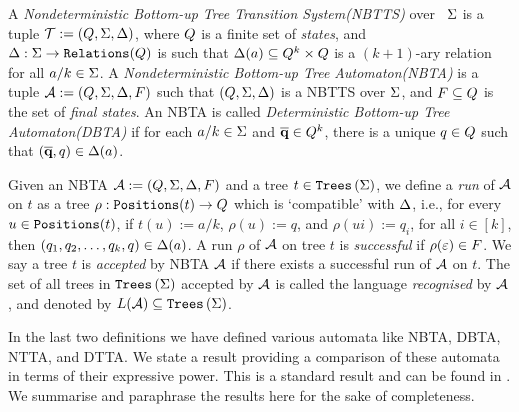 \begin{definition}\label{def:nbta}
    A \emph{Nondeterministic Bottom-up Tree Transition System(NBTTS)} over \rab\ $\Sigma$ is a tuple $\mathcal{T} := (Q, \Sigma, \Delta)$, where $Q$ is a finite set of \emph{states}, and $\Delta : \Sigma \to \texttt{Relations}(Q)$ is such that $\Delta(a) \subseteq Q^k \times Q$ is a $(k+1)$-ary relation for all $a/k \in \Sigma$. A \emph{Nondeterministic Bottom-up Tree Automaton(NBTA)} is a tuple $\mathcal{A} := (Q, \Sigma, \Delta, F)$ such that $(Q, \Sigma, \Delta)$ is a NBTTS over $\Sigma$, and $F \subseteq Q$ is the set of \emph{final states}. An NBTA is called \emph{Deterministic Bottom-up Tree Automaton(DBTA)} if for each $a/k \in \Sigma$ and $\overline{\textbf{q}} \in Q^k$, there is a unique $q \in Q$ such that $(\overline{\textbf{q}}, q) \in \Delta(a)$.
\end{definition}

\begin{definition}\label{def:runAcceptanceNbta}
    Given an NBTA $\mathcal{A} := (Q, \Sigma, \Delta, F)$ and a tree $t \in \texttt{Trees}\left(\Sigma\right)$, we define a \emph{run} of $\mathcal{A}$ on $t$ as a tree $\rho : \texttt{Positions}(t) \to Q$ which is `compatible' with $\Delta$, i.e., for every $u \in \texttt{Positions}(t)$, if $t(u) := a/k$, $\rho(u) := q$, and $\rho(ui) := q_i$, for all $i \in [k]$, then $(q_1, q_2, \dots, q_k, q) \in \Delta(a)$. A run $\rho$ of $\mathcal{A}$ on tree $t$ is \emph{successful} if $\rho(\varepsilon) \in F$. We say a tree $t$ is \emph{accepted} by NBTA $\mathcal{A}$ if there exists a successful run of $\mathcal{A}$ on $t$. The set of all trees in $\texttt{Trees}\left(\Sigma\right)$ accepted by $\mathcal{A}$ is called the language \emph{recognised} by $\mathcal{A}$, and denoted by $L(\mathcal{A}) \subseteq \texttt{Trees}\left(\Sigma\right)$.
\end{definition}

In the last two definitions we have defined various automata like NBTA, DBTA, NTTA, and DTTA. We state a result providing a comparison of these automata in terms of their expressive power. This is a standard result and can be found in \cite{tata}. We summarise and paraphrase the results here for the sake of completeness.

